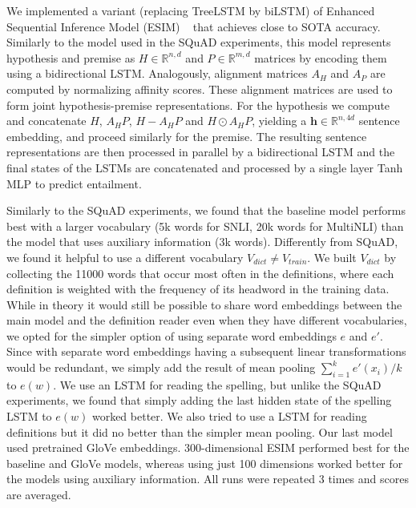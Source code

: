 We implemented a variant (replacing TreeLSTM by biLSTM) of Enhanced Sequential
Inference Model (ESIM) ~\citep{DBLP:journals/corr/ChenZLWJ16} that achieves close to SOTA accuracy. Similarly to the model used in the SQuAD experiments, this model represents hypothesis and premise as $H\in\mathbb{R}^{n,d}$ and $P\in\mathbb{R}^{m,d}$ matrices by encoding them using a bidirectional LSTM. Analogously, alignment matrices $A_H$ and $A_P$  are computed by normalizing affinity scores. These alignment matrices are used to form joint hypothesis-premise representations. 
For the hypothesis we compute and concatenate $H$, $A_H P$, $H - A_H P$ and $H \odot A_H P$, yielding a $\mathbf{h} \in \mathbb{R}^{n, 4d}$ sentence embedding, and proceed similarly for the premise. The resulting sentence representations are then processed in parallel by a bidirectional LSTM and the final states of the LSTMs are concatenated and processed by a single layer Tanh MLP to predict entailment.

Similarly to the SQuAD experiments, we found that the baseline model performs best with a larger vocabulary (5k words for SNLI, 20k words for MultiNLI) than the model that uses auxiliary information (3k words). Differently from SQuAD, we found it helpful to use a different vocabulary $V_{dict} \neq V_{train}$. We built $V_{dict}$ by collecting the 11000 words that occur most often in the definitions, where each definition is weighted with the frequency of its headword in the training data. While in theory it would still be possible to share word embeddings between the main model and the definition reader even when they have different vocabularies, we opted for the simpler option of using separate word embeddings $e$ and $e'$. Since with separate word embeddings having a subsequent linear transformations would be redundant, we simply add the result of mean pooling $\sum_{i=1}^k e'(x_i) / k$ to $e(w)$. We use an LSTM for reading the spelling, but unlike the SQuAD experiments, we found that simply adding the last hidden state of the spelling LSTM to $e(w)$ worked better. We also tried to use a LSTM for reading definitions but it did no better than the simpler mean pooling. Our last model used pretrained GloVe embeddings. 300-dimensional ESIM performed best for the baseline and GloVe models, whereas using just 100 dimensions worked better for the models using auxiliary information. 
All runs were repeated 3 times and scores are averaged. 



